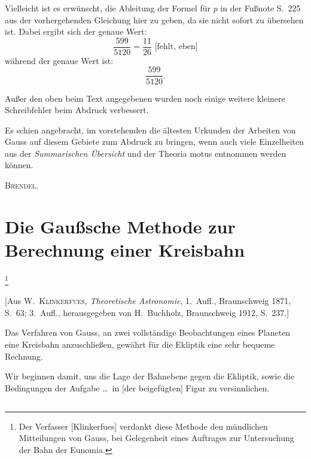 \documentclass[12pt,a4paper]{article}
\theoremstyle{plain}
\theoremstyle{definition}
\theoremstyle{remark}
\begin{document}
Vielleicht ist es erwünscht, die Ableitung der Formel für $p$ in der Fußnote S.~225 aus der vorhergehenden Gleichung hier zu geben, da sie nicht sofort zu übersehen ist. Dabei ergibt sich der genaue Wert:
\[
\frac{599}{5120} = \frac{11}{26}\text{ [fehlt, eben]}
\]
während der genaue Wert ist:
\[
\frac{599}{5120}.
\]

\vspace{0.3em}
\noindent Außer den oben beim Text angegebenen wurden noch einige weitere kleinere Schreibfehler beim Abdruck verbessert.

Es schien angebracht, im vorstehenden die ältesten Urkunden der Arbeiten von Gauss auf diesem Gebiete zum Abdruck zu bringen, wenn auch viele Einzelheiten aus der \textit{Summarischen Übersicht} und der Theoria motus entnommen werden können.

\begin{flushright}
\textsc{Brendel.}
\end{flushright}

\newpage
\section*{Die Gaußsche Methode zur Berechnung einer Kreisbahn}
\footnote{Der Verfasser [Klinkerfues] verdankt diese Methode den mündlichen Mitteilungen von Gauss, bei Gelegenheit eines Auftrages zur Untersuchung der Bahn der Eunomia.}

[Aus \textsc{W.~Klinkerfues}, \textit{Theoretische Astronomie}, 1.~Aufl., Braunschweig 1871, S.~63; 3.~Aufl., herausgegeben von H.~Buchholz, Braunschweig 1912, S.~237.]

Das Verfahren von Gauss, an zwei vollständige Beobachtungen eines Planeten eine Kreisbahn anzuschließen, gewährt für die Ekliptik eine sehr bequeme Rechnung.

Wir beginnen damit, uns die Lage der Bahnebene gegen die Ekliptik, sowie die Bedingungen der Aufgabe \ldots\ in [der beigefügten] Figur zu versinnlichen.

\subsection*{}
\end{document}
